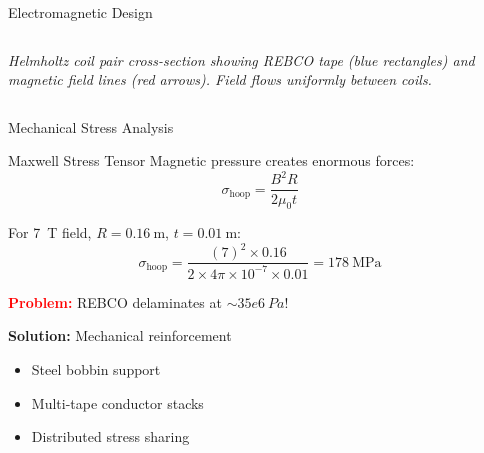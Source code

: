 \documentclass[aspectratio=169,xcolor={table,dvipsnames}]{beamer}
\newcommand{\Tesla}[1]{#1~T}
\newcommand{\Pascal}[1]{#1~Pa}
\newcommand{\highlight}[1]{\textcolor{red}{\textbf{#1}}}
\begin{document}
\begin{frame}{Electromagnetic Design}
\begin{columns}
\begin{column}{0.5\textwidth}
            
            \vspace{0.2cm}
            \begin{center}
                \footnotesize
                \textit{Helmholtz coil pair cross-section showing REBCO tape (blue rectangles) and magnetic field lines (red arrows). Field flows uniformly between coils.}
            \end{center}
        \end{column}
    \end{columns}
\end{frame}

\begin{frame}{Mechanical Stress Analysis}
    \begin{block}{Maxwell Stress Tensor}
        Magnetic pressure creates enormous forces:
        \begin{equation}
            \sigma_{\text{hoop}} = \frac{B^2 R}{2 \mu_0 t}
        \end{equation}
        
        For \Tesla{7} field, $R = 0.16~\text{m}$, $t = 0.01~\text{m}$:
        \begin{equation}
            \sigma_{\text{hoop}} = \frac{(7)^2 \times 0.16}{2 \times 4\pi \times 10^{-7} \times 0.01} = 178~\text{MPa}
        \end{equation}
    \end{block}
    
    \vspace{0.3cm}
    \highlight{Problem:} REBCO delaminates at $\sim\Pascal{35e6}$!
    
    \textbf{Solution:} Mechanical reinforcement
    \begin{itemize}
        \item Steel bobbin support
        \item Multi-tape conductor stacks
        \item Distributed stress sharing
    \end{itemize}
\end{frame}
\end{document}
